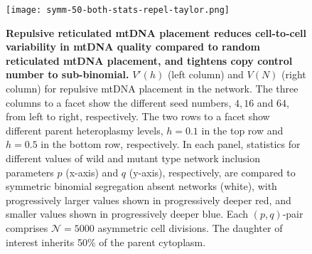 \documentclass{article}
\begin{document}
\begin{appendices}
\begin{figure}
\centering
\texttt{[image: symm-50-both-stats-repel-taylor.png]}
\caption{\textbf{Repulsive reticulated mtDNA placement reduces cell-to-cell variability in mtDNA quality compared to random reticulated mtDNA placement, and tightens copy control number to sub-binomial.} $V'(h)$ (left column) and $V(N)$ (right column) for repulsive mtDNA placement in the network. The three columns to a facet show the different seed numbers, $4, 16$ and $64$, from left to right, respectively. The two rows to a facet show different parent heteroplasmy levels, $h=0.1$ in the top row and $h=0.5$ in the bottom row, respectively. In each panel, statistics for different values of wild and mutant type network inclusion parameters $p$ (x-axis) and $q$ (y-axis), respectively, are compared to symmetric binomial segregation absent networks (white), with progressively larger values shown in progressively deeper red, and smaller values shown in progressively deeper blue. Each $(p,q)$-pair comprises $\mathcal{N}=5000$ asymmetric cell divisions. The daughter of interest inherits 50\% of the parent cytoplasm.}\label{fig:symm-50-both-stats-repel-taylor}
\end{figure}


\end{appendices}
\end{document}
